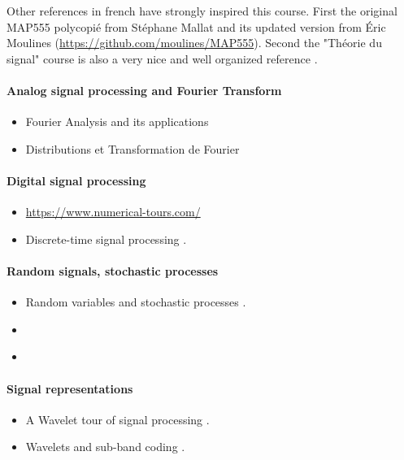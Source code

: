 Other references in french have strongly  inspired this course. First the
original MAP555 polycopié from Stéphane Mallat \cite{mallat2015traitement} and its updated version from Éric
Moulines ({\url{https://github.com/moulines/MAP555}}). Second the "Théorie
du signal" course is also a very nice and well organized reference \cite{jutten2018theorie}. 

\paragraph{Analog signal processing and Fourier Transform} 

\begin{itemize}
    \item Fourier Analysis and its applications \cite{vretblad2003fourier}
    \item Distributions et Transformation de Fourier \cite{roddier1985distributions}
  \end{itemize}

  \paragraph{Digital signal processing}

  \begin{itemize}
    \item   \url{https://www.numerical-tours.com/}
    
    \item  Discrete-time signal processing \cite{oppenheim1999discrete}.
  \end{itemize}

\paragraph{Random signals, stochastic processes}

\begin{itemize}
    \item Random variables and stochastic processes \cite{papoulis1965random}.
    \item \cite{ross1996stochastic}
    \item \cite{kay1993fundamentals}
\end{itemize}



\paragraph{Signal representations}
\begin{itemize}
    \item A Wavelet tour of signal processing \cite{mallat1999wavelet}.
    \item Wavelets and sub-band coding \cite{vetterli1995wavelets}.
\end{itemize}

